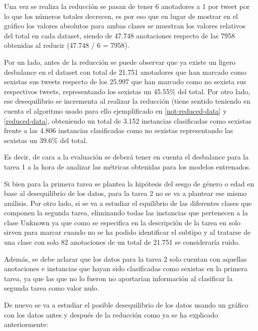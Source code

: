 Una vez se realiza la reducción se pasan de tener 6 anotadores a 1 por tweet por lo que los números totales decrecen, es por eso que en lugar de mostrar en el gráfico los valores absolutos para ambas clases se muestran los valores relativos del total en cada dataset, siendo de 47.748 anotaciones respecto de las 7958 obtenidas al reducir (47.748 / 6 = 7958).

Por un lado, antes de la reducción se puede observar que ya existe un ligero desbalance en el dataset con total de 21.751 anotadores que han marcado como sexistas sus tweets respecto de los 25.997 que han marcado como no sexista sus respectivos tweets,  representando los sexistas un 45.55\% del total. Por otro lado, ese desequilibrio se incrementa al realizar la reducción (tiene sentido teniendo en cuenta el algoritmo usado para ello ejemplificado en \autoref{not-reduced-data} y \autoref{reduced-data}, obteniendo un total de 3.152 instancias clasificadas como sexistas frente a las 4.806 instancias clasificadas como no sexistas representando las sexistas un 39.6\% del total.

Es decir, de cara a la evaluación se deberá tener en cuenta el desbalance para la tarea 1 a la hora de analizar las métricas obtenidas para los modelos entrenados.


Si bien para la primera tarea se plantea la hipótesis del sesgo de género o edad en base al desequilibrio de los datos, para la tarea 2 no se va a plantear ese mismo análisis. Por otro lado, si se va a estudiar el equilibrio de las diferentes clases que componen la segunda tarea, eliminando todas las instancias que pertenecen a la clase Unknown ya que como se especifica en la descripción de la tarea en \cite{EXIST2023} solo sirven para marcar cuando no se ha podido identificar el subtipo y al tratarse de una clase con solo 82 anotaciones de un total de 21.751 se consideraría ruido.

Además, se debe aclarar que los datos para la tarea 2 solo cuentan con aquellas anotaciones e instancias que hayan sido clasificadas como sexistas en la primera tarea, ya que las que no lo fueron no aportarían información al clasificar la segunda tarea como valor nulo.

De nuevo se va a estudiar el posible desequilibrio de los datos usando un gráfico con los datos antes y después de la reducción como ya se ha explicado anteriormente:

